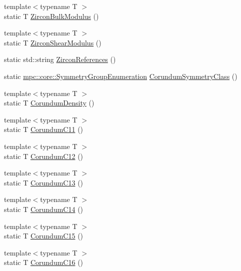\begin{DoxyCompactItemize}
\item 
{\footnotesize template$<$typename T $>$ }\\static T \mbox{\hyperlink{namespacempc_1_1data_a6f6163c5dcce4ef5fc13b26dc1e19070}{Zircon\+Bulk\+Modulus}} ()
\item 
{\footnotesize template$<$typename T $>$ }\\static T \mbox{\hyperlink{namespacempc_1_1data_a5ce5d70497649c73168a4c976e81bb0c}{Zircon\+Shear\+Modulus}} ()
\item 
static std\+::string \mbox{\hyperlink{namespacempc_1_1data_a583bf9e1584fe880295a7f08843f4312}{Zircon\+References}} ()
\item 
static \mbox{\hyperlink{namespacempc_1_1core_a9d979684062547055a0ef5c13077bad8}{mpc\+::core\+::\+Symmetry\+Group\+Enumeration}} \mbox{\hyperlink{namespacempc_1_1data_abc3b6f42a9d1f955584819d27b0ac35d}{Corundum\+Symmetry\+Class}} ()
\item 
{\footnotesize template$<$typename T $>$ }\\static T \mbox{\hyperlink{namespacempc_1_1data_ac8d3f7649e1181d8ad8464f25535b3ff}{Corundum\+Density}} ()
\item 
{\footnotesize template$<$typename T $>$ }\\static T \mbox{\hyperlink{namespacempc_1_1data_ab2fd9437000ae59c1ac5fa3ea367aec6}{Corundum\+C11}} ()
\item 
{\footnotesize template$<$typename T $>$ }\\static T \mbox{\hyperlink{namespacempc_1_1data_a9d7f843187d5ea95988e104c3329609f}{Corundum\+C12}} ()
\item 
{\footnotesize template$<$typename T $>$ }\\static T \mbox{\hyperlink{namespacempc_1_1data_a7b2d2fec09cb330724cfccb23e3be64b}{Corundum\+C13}} ()
\item 
{\footnotesize template$<$typename T $>$ }\\static T \mbox{\hyperlink{namespacempc_1_1data_ab7503a08bbb5f63448df10b9ff67a130}{Corundum\+C14}} ()
\item 
{\footnotesize template$<$typename T $>$ }\\static T \mbox{\hyperlink{namespacempc_1_1data_abf2d104318b0dc68e995c4494d4d2c7f}{Corundum\+C15}} ()
\item 
{\footnotesize template$<$typename T $>$ }\\static T \mbox{\hyperlink{namespacempc_1_1data_afa0eac7a5f7d01a52a7a686ca1ac59a2}{Corundum\+C16}} ()
\item 

\end{DoxyCompactItemize}
